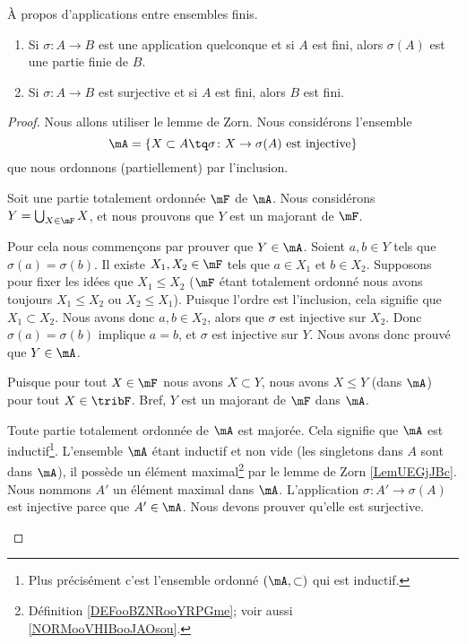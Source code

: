 \begin{lemma}       \label{LEMooPGPVooZzlFvf}
	À propos d'applications entre ensembles finis.
	\begin{enumerate}
		\item       \label{ITEMooNCCUooBGrtdn}
		      Si \( \sigma\colon A\to B\) est une application quelconque et si \( A\) est fini, alors \( \sigma(A)\) est une partie finie de \( B\).
		\item       \label{ITEMooKQMFooSzmXrd}
		      Si \( \sigma\colon A\to B\) est surjective et si \( A\) est fini, alors \( B\) est fini.
	\end{enumerate}
\end{lemma}

\begin{proof}
	Nous allons utiliser le lemme de Zorn. Nous considérons l'ensemble
	\begin{equation}
		\mA=\{ X\subset A\tq \sigma\colon X\to \sigma(A) \text{ est injective} \}
	\end{equation}
	que nous ordonnons (partiellement) par l'inclusion.
	\begin{subproof}
		Soit une partie totalement ordonnée \( \mF\) de \( \mA\). Nous considérons \( Y=\bigcup_{X\in \mF}X\), et nous prouvons que \( Y\) est un majorant de \( \mF\).

		Pour cela nous commençons par prouver que \( Y\in \mA\). Soient \( a,b\in Y\) tels que \( \sigma(a)=\sigma(b)\). Il existe \( X_1,X_2\in \mF\) tels que \( a\in X_1\) et \( b\in X_2\). Supposons pour fixer les idées que \( X_1\leq X_2\) (\( \mF\) étant totalement ordonné nous avons toujours \( X_1\leq X_2\) ou \( X_2\leq X_1\)). Puisque l'ordre est l'inclusion, cela signifie que \( X_1\subset X_2\). Nous avons donc \( a,b\in X_2\), alors que \( \sigma\) est injective sur \( X_2\). Donc \(\sigma(a)=\sigma(b)\) implique \( a=b\), et \( \sigma\) est injective sur \( Y\). Nous avons donc prouvé que \( Y\in \mA\).

		Puisque pour tout \( X\in\mF\) nous avons \( X\subset Y\), nous avons \( X\leq Y\) (dans \( \mA\)) pour tout \( X\in \tribF\). Bref, \( Y\) est un majorant de \( \mF\) dans \( \mA\).

		Toute partie totalement ordonnée de \( \mA\) est majorée. Cela signifie que \( \mA\) est inductif\footnote{Plus précisément c'est l'ensemble ordonné \( (\mA,\subset)\) qui est inductif.}.
		\spitem[Zorn]
		L'ensemble \( \mA\) étant inductif et non vide (les singletons dans \( A\) sont dans \( \mA\)), il possède un élément maximal\footnote{Définition \ref{DEFooBZNRooYRPGme}; voir aussi \ref{NORMooVHIBooJAOsou}.} par le lemme de Zorn \ref{LemUEGjJBc}. Nous nommons \( A'\) un élément maximal dans \( \mA\).
		\spitem[Bijective]
		L'application \( \sigma\colon A'\to \sigma(A)\) est injective parce que \( A'\in \mA\). Nous devons prouver qu'elle est surjective.


\end{subproof}
\end{proof}
